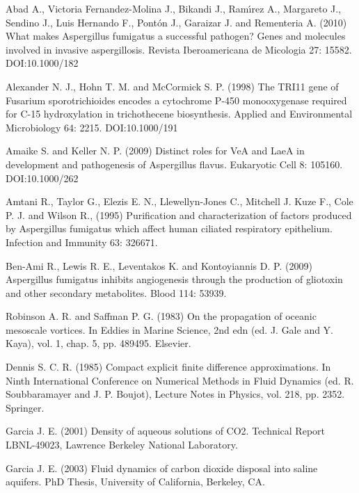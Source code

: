 \documentclass{dsj}
\begin{document}
\begin{thebibliography}{9}

Abad A., Victoria Fernandez-Molina J., Bikandi J., Ram\'\i rez A., 
Margareto J., Sendino J., Luis Hernando F., Pont\'on J.,
Garaizar J. and Rementeria A. (2010)
What makes Aspergillus fumigatus a successful pathogen? Genes and molecules
involved in invasive aspergillosis. Revista Iberoamericana de Micologia 27:
15582. DOI:10.1000/182

Alexander N. J., Hohn T. M. and McCormick S. P. (1998) The TRI11 gene
of Fusarium sporotrichioides encodes a cytochrome P-450 monooxygenase
required for C-15 hydroxylation in trichothecene biosynthesis. Applied
and Environmental Microbiology 64: 2215. DOI:10.1000/191

Amaike S. and Keller N. P. (2009) Distinct roles for VeA and LaeA in
development and pathogenesis of Aspergillus flavus. Eukaryotic Cell 8:
105160. DOI:10.1000/262

Amtani R., Taylor G., Elezis E. N., Llewellyn-Jones C., Mitchell J.
Kuze F., Cole P. J. and Wilson R., (1995) Purification and
characterization of factors produced by
Aspergillus fumigatus which affect human ciliated respiratory epithelium. Infection
and Immunity 63: 326671.

Ben-Ami R., Lewis R. E., Leventakos K. and Kontoyiannis D. P. (2009)
Aspergillus fumigatus inhibits angiogenesis through the production of
gliotoxin and other secondary metabolites. Blood 114: 53939.

Robinson A. R. and Saffman P. G. (1983) On the propagation of oceanic
mesoscale vortices. In Eddies in Marine Science, 2nd edn (ed. J. Gale
and Y. Kaya), vol. 1, chap. 5, pp. 489495. Elsevier.

Dennis S. C. R. (1985) Compact explicit finite difference
approximations. In Ninth International Conference on Numerical Methods
in Fluid Dynamics (ed. R. Soubbaramayer and J. P. Boujot), Lecture
Notes in Physics, vol. 218, pp. 2352. Springer.

Garcia J. E. (2001) Density of aqueous solutions of CO2. Technical
Report LBNL-49023, Lawrence Berkeley National Laboratory.

Garcia J. E. (2003) Fluid dynamics of carbon dioxide disposal into saline
aquifers. PhD Thesis, University of California, Berkeley, CA.

\end{thebibliography}
\end{document}
